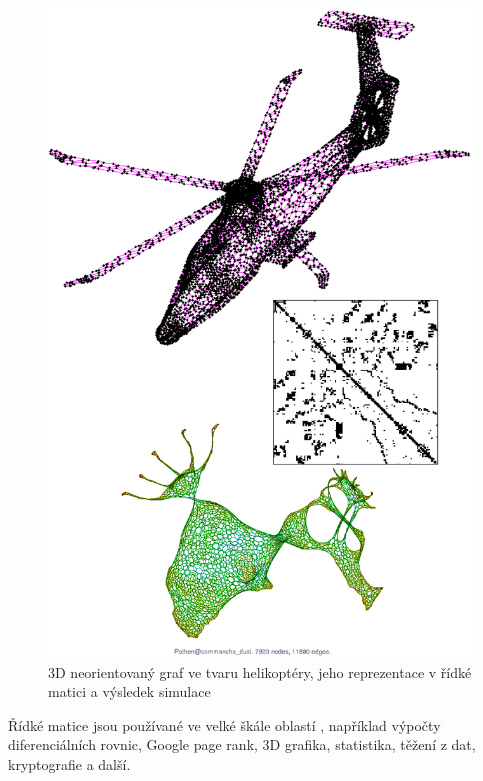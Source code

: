 \begin{figure}
	\includegraphics[width=1.0\textwidth]{./images/commanche/commanche}
	\caption{3D neorientovaný graf ve tvaru helikoptéry, jeho reprezentace v řídké matici a výsledek simulace}
	\label{fig:commanche}
\end{figure}

Řídké matice jsou používané ve velké škále oblastí \cite{sparsesw}, například výpočty diferenciálních rovnic, Google page rank, 3D grafika, statistika, těžení z dat, kryptografie a další.

